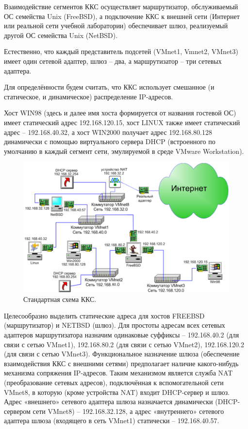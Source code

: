 Взаимодействие сегментов ККС осуществляет маршрутизатор, обслуживаемый ОС семейства Unix (FreeBSD), а подключение ККС к внешней сети (Интернет или реальной сети учебной лаборатории) обеспечивает шлюз, реализуемый другой ОС семейства Unix (NetBSD).

Естественно, что каждый представитель подсетей (VMnet1, Vmnet2, VMnet3) имеет один сетевой адаптер, шлюз – два, а маршрутизатор – три сетевых адаптера.

Для определённости будем считать, что ККС использует смешанное (и статическое, и динамическое) распределение IP-адресов. 

Хост WIN98 (здесь и далее имя хоста формируется от названия гостевой ОС) имеет статический адрес 192.168.120.15, хост LINUX также имеет статический адрес – 192.168.40.32, а хост WIN2000 получает адрес 192.168.80.128 динамически с помощью виртуального сервера DHCP (встроенного по умолчанию в каждый сегмент сети, эмулируемой в среде VMware Workstation).

\begin{figure}[h!]
\centering
\includegraphics[scale=1]{res/network_general2}
\caption{Стандартная схема ККС.}
\end{figure}

Целесообразно выделить статические адреса для хостов FREEBSD (маршрутизатор) и NETBSD (шлюз). Для простоты адресам всех сетевых адаптеров маршрутизатора назначим одинаковые суффиксы – 192.168.40.2 (для связи с сетью VMnet1), 192.168.80.2 (для связи с сетью VMnet2), 192.168.120.2 (для связи с сетью VMnet3). Функциональное назначение шлюза (обеспечение взаимодействия ККС с внешними сетями) предполагает наличие какого-нибудь механизма сопряжения IP-адресов. Таким механизмом является служба NAT (преобразование сетевых адресов), подключённая к вспомогательной сети VMnet8, в которую (кроме устройства NAT) входит DHCP-сервер и шлюз. Адрес «внешнего» сетевого адаптера шлюза назначается динамически (DHCP-сервером сети VMnet8) – 192.168.32.128, а  адрес «внутреннего» сетевого адаптера шлюза (входящего в сеть VMnet1) статически – 192.168.40.57.

